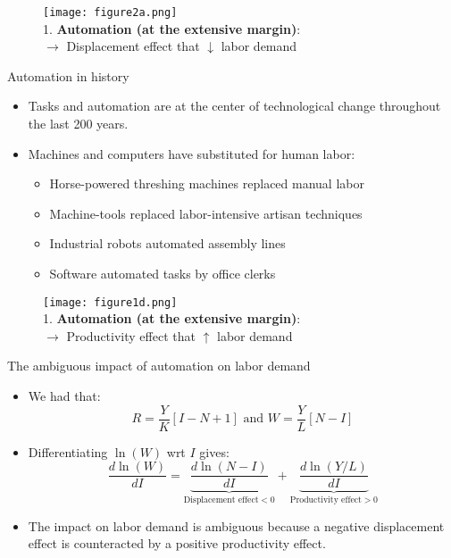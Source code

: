 \documentclass[notes=show]{beamer}
\begin{document}
\newpage
\begin{center}
\begin{figure}
\texttt{[image: figure2a.png]}
\\ 1. \textbf{Automation (at the extensive margin)}: \\
$\rightarrow$ Displacement effect that $ \downarrow$ labor demand
\end{figure} 
\end{center}
\newpage

\begin{frame}{Automation in history}
\begin{itemize}
\item Tasks and automation are at the center of technological change throughout the last 200 years. \medskip
\item Machines and computers have substituted for human labor: \medskip
\begin{itemize}
\item Horse-powered threshing machines replaced manual labor \medskip
\item Machine-tools replaced labor-intensive artisan techniques \medskip
\item Industrial robots automated assembly lines \medskip
\item Software automated tasks by office clerks
\end{itemize}
\end{itemize}
\end{frame}

\newpage
\begin{center}
\begin{figure}
\texttt{[image: figure1d.png]}
\\ 1. \textbf{Automation (at the extensive margin)}: \\
$\rightarrow$ Productivity effect that $ \uparrow$ labor demand
\end{figure} 
\end{center}
\newpage

\begin{frame}{The ambiguous impact of automation on labor demand}
\begin{itemize}
\item We had that:
\[
R = \frac{Y}{K}[I-N+1] \text{ and }  W = \frac{Y}{L}[N-I] \tag{5}
\]
\item Differentiating $\ln(W)$ wrt $I$ gives:
\[
\frac{d\ln(W)}{dI}=\underbrace{\frac{d\ln(N-I)}{dI}}_{\text{Displacement effect}<0} + \underbrace{\frac{d\ln(Y/L)}{dI}}_{\text{Productivity effect}>0} \tag{7} \label{eq7}
\]
\item The impact on labor demand is ambiguous because a negative displacement effect is counteracted by a positive productivity effect.
\end{itemize}
\end{frame}
\end{document}
